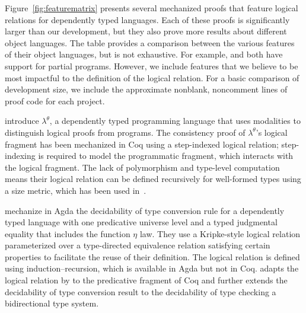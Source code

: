 \documentclass[\ifpublic nolinenum\else\fi,online,OA]{jfp}
\theoremstyle{definition}
\begin{document}
Figure~\ref{fig:featurematrix} presents several mechanized proofs
that feature logical relations for dependently typed languages.
Each of these proofs is significantly larger than our development, but they
also prove more results about different object languages.
The table provides a comparison between the various features of their
object languages, but is not exhaustive. For example,
\citet{casinghino:combining-proofs-programs} and
\citet{anand2014towards} both have support for partial
programs. However, we include features that we believe to be most
impactful to the definition of the logical relation.
For a basic comparison of development size, we include the approximate
nonblank, noncomment lines of proof code for each project.

\citet{casinghino:combining-proofs-programs} introduce $\lambda^\theta$,
a dependently typed programming language that uses modalities to distinguish
logical proofs from programs.
The consistency proof of $\lambda^\theta$'s logical fragment has been
mechanized in Coq using a step-indexed logical relation;
step-indexing is required to model the programmatic fragment, which
interacts with the logical fragment.
The lack of polymorphism and type-level computation means their
logical relation can be defined recursively for well-formed types using
a size metric, which has been used in~\citet{liu2023dependently}.

\citet{decagda} mechanize in Agda the decidability of type
conversion rule for a dependently typed language with one predicative
universe level and a typed judgmental equality that includes the function
$\eta$ law. They
use a Kripke-style logical relation parameterized over a
type-directed equivalence relation satisfying certain
properties to facilitate the reuse of their definition. The
logical relation is defined using induction--recursion,
which is available in Agda but not in Coq.
\citet{martin-lof-a-la-coq} adapts the logical relation
by \citet{decagda} to the predicative fragment of Coq and further
extends the decidability of type conversion result to the decidability of
type checking a bidirectional type system.
\end{document}
